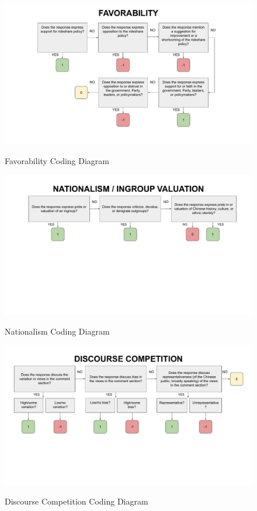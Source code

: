 \documentclass[11pt]{article}
\begin{document}
\begin{figure}[H]
  \centering
  \caption{Favorability Coding Diagram}
  \vspace{1em}
  \includegraphics[width=\textwidth]{figures/coding_diagrams/favorability.pdf}
  \label{favorability}
\end{figure}

\begin{figure}[H]
  \centering
  \caption{Nationalism Coding Diagram}
  \vspace{1em}
  \includegraphics[width=\textwidth]{figures/coding_diagrams/nationalism.pdf}
  \label{nationalism}
\end{figure}

\begin{figure}[H]
  \centering
  \caption{Discourse Competition Coding Diagram}
  \vspace{1em}
  \includegraphics[width=\textwidth]{figures/coding_diagrams/discourse_competition.pdf}
  \label{discourse_competition}
\end{figure}

\newpage



\end{document}
